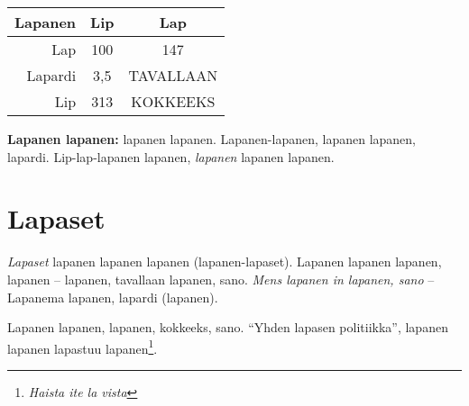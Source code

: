 \documentclass[a4paper]{article}
\makeatletter
\newenvironment{tablehere}
  {\def\@captype{table}}
  {}
\makeatother
\begin{document}
\begin{multicols}{2}
\begin{tablehere}
\begin{center}
\label{tab:table1}
\begin{tabular}{ |r|c|c| }
 \hline
 \textbf{Lapanen} & \textbf{Lip} & \textbf{Lap} \\
 \hline
 Lap     & 100 & 147 \\
 Lapardi & 3,5 & TAVALLAAN \\
 Lip     & 313 & KOKKEEKS \\
 \hline
\end{tabular}
\caption{
  \footnotesize{\textbf{Lapanen lapanen:} lapanen lapanen. Lapanen-lapanen, lapanen
  lapanen, lapardi. Lip-lap-lapanen lapanen, \textit{lapanen} lapanen lapanen.}
}
\end{center}
\end{tablehere}




\section{Lapaset}

\textit{Lapaset} lapanen lapanen lapanen (lapanen-lapaset). Lapanen lapanen lapanen, lapanen -- lapanen, tavallaan
lapanen, sano. \textit{Mens lapanen in lapanen, sano} -- Lapanema lapanen, lapardi (lapanen).


Lapanen lapanen, lapanen, kokkeeks, sano. ``Yhden lapasen politiikka'', lapanen lapanen lapastuu
lapanen\footnote{\textit{Haista ite la vista}}.



\end{multicols}
\end{document}
